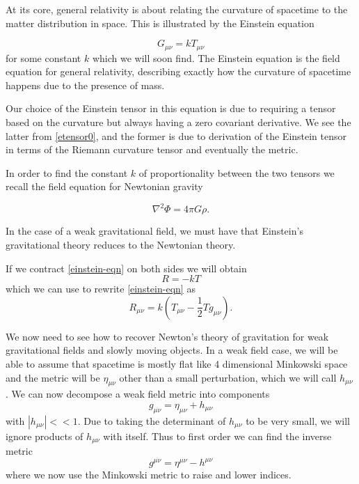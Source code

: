 At its core, general relativity is about relating the curvature of spacetime to the matter distribution in space. This is illustrated by the Einstein equation \cite{carroll, hartle}

\begin{equation} \label{einstein-eqn}
	G_{\mu \nu} = k T_{\mu \nu} 
\end{equation}
for some constant \(k\) which we will soon find. The Einstein equation is the field equation for general relativity, describing exactly how the curvature of spacetime happens due to the presence of mass.

Our choice of the Einstein tensor in this equation is due to requiring a tensor based on the curvature but always having a zero covariant derivative. We see the latter from \eqref{etensor0}, and the former is due to derivation of the Einstein tensor in terms of the Riemann curvature tensor and eventually the metric.

In order to find the constant \(k\) of proportionality between the two tensors we recall the field equation for Newtonian gravity

\begin{equation} \label{poisson}
	\nabla^2 \Phi = 4\pi G \rho .
\end{equation}

\noindent In the case of a weak gravitational field, we must have that Einstein's gravitational theory reduces to the Newtonian theory.

If we contract \eqref{einstein-eqn} on both sides we will obtain \cite{carroll, cheng}
\begin{equation} \label{einstein-contract}
	R = - k T
\end{equation}
which we can use to rewrite \eqref{einstein-eqn} as
\begin{equation} \label{einstein-eqn2}
	R_{\mu \nu} = k \left(T_{\mu \nu} - \frac{1}{2} T g_{\mu \nu}\right) .
\end{equation}

We now need to see how to recover Newton's theory of gravitation for weak gravitational fields and slowly moving objects. In a weak field case, we will be able to assume that spacetime is mostly flat like 4 dimensional Minkowski space and the metric will be \(\eta_{\mu \nu}\) other than a small perturbation, which we will call \(h_{\mu \nu}\) \cite{carroll, woodhouse}. We can now decompose a weak field metric into components
\begin{equation} \label{weak-field}
	g_{\mu \nu} = \eta_{\mu \nu} + h_{\mu \nu}
\end{equation}
with \(|h_{\mu \nu}| << 1\). Due to taking the determinant of \(h_{\mu \nu}\) to be very small, we will ignore products of \(h_{\mu \nu}\) with itself. Thus to first order we can find the inverse metric
\begin{equation} \label{weak-field-inverse}
	g^{\mu \nu} = \eta^{\mu \nu} - h^{\mu \nu}
\end{equation}
where we now use the Minkowski metric to raise and lower indices.


